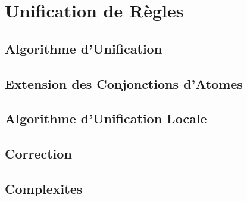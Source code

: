 
\section{Unification de R\`egles}
	\label{unification_regles}

%	

\subsection{Algorithme d'Unification}
	\label{unification_regles_algo_unification}
	

\subsection{Extension des Conjonctions d'Atomes}
	\label{unification_regles_algo_extension}
	

\subsection{Algorithme d'Unification Locale}
	\label{unification_regles_algo_unification_locale}
	
\newpage
\subsection{Correction}
	\label{unification_regles_correction}
	

\subsection{Complexites}
	\label{unification_regles_complexites}
	
